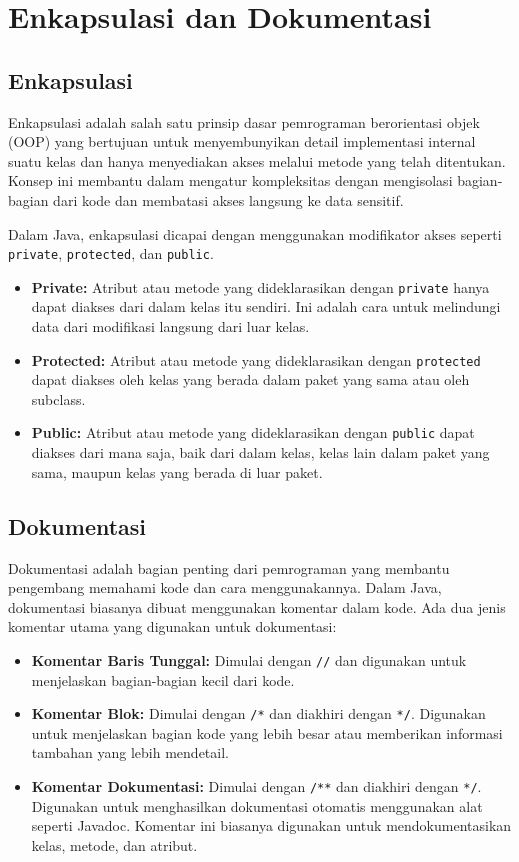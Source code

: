 
\chapter{Enkapsulasi dan Dokumentasi}

\section{Enkapsulasi}

Enkapsulasi adalah salah satu prinsip dasar pemrograman berorientasi objek (OOP) yang bertujuan untuk menyembunyikan detail implementasi internal suatu kelas dan hanya menyediakan akses melalui metode yang telah ditentukan. Konsep ini membantu dalam mengatur kompleksitas dengan mengisolasi bagian-bagian dari kode dan membatasi akses langsung ke data sensitif.

Dalam Java, enkapsulasi dicapai dengan menggunakan modifikator akses seperti \texttt{private}, \texttt{protected}, dan \texttt{public}. 

\begin{itemize}
\item \textbf{Private:} Atribut atau metode yang dideklarasikan dengan \texttt{private} hanya dapat diakses dari dalam kelas itu sendiri. Ini adalah cara untuk melindungi data dari modifikasi langsung dari luar kelas.
\item \textbf{Protected:} Atribut atau metode yang dideklarasikan dengan \texttt{protected} dapat diakses oleh kelas yang berada dalam paket yang sama atau oleh subclass.
\item \textbf{Public:} Atribut atau metode yang dideklarasikan dengan \texttt{public} dapat diakses dari mana saja, baik dari dalam kelas, kelas lain dalam paket yang sama, maupun kelas yang berada di luar paket.
\end{itemize}


\section{Dokumentasi}

Dokumentasi adalah bagian penting dari pemrograman yang membantu pengembang memahami kode dan cara menggunakannya. Dalam Java, dokumentasi biasanya dibuat menggunakan komentar dalam kode. Ada dua jenis komentar utama yang digunakan untuk dokumentasi:

\begin{itemize}
\item \textbf{Komentar Baris Tunggal:} Dimulai dengan \texttt{//} dan digunakan untuk menjelaskan bagian-bagian kecil dari kode.
\item \textbf{Komentar Blok:} Dimulai dengan \texttt{/*} dan diakhiri dengan \texttt{*/}. Digunakan untuk menjelaskan bagian kode yang lebih besar atau memberikan informasi tambahan yang lebih mendetail.
\item \textbf{Komentar Dokumentasi:} Dimulai dengan \texttt{/**} dan diakhiri dengan \texttt{*/}. Digunakan untuk menghasilkan dokumentasi otomatis menggunakan alat seperti Javadoc. Komentar ini biasanya digunakan untuk mendokumentasikan kelas, metode, dan atribut.
\end{itemize}

